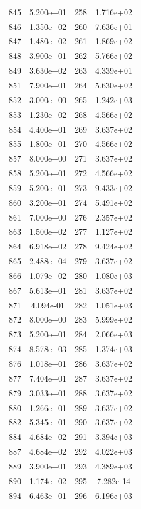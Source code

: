 \documentclass[12pt]{article}
\begin{document}
\begin{longtable}{@{}cccc@{}}
845 & 5.200e+01 & 258 & 1.716e+02 \\
846 & 1.350e+02 & 260 & 7.636e+01 \\
847 & 1.480e+02 & 261 & 1.869e+02 \\
848 & 3.900e+01 & 262 & 5.766e+02 \\
849 & 3.630e+02 & 263 & 4.339e+01 \\
851 & 7.900e+01 & 264 & 5.630e+02 \\
852 & 3.000e+00 & 265 & 1.242e+03 \\
853 & 1.230e+02 & 268 & 4.566e+02 \\
854 & 4.400e+01 & 269 & 3.637e+02 \\
855 & 1.800e+01 & 270 & 4.566e+02 \\
857 & 8.000e+00 & 271 & 3.637e+02 \\
858 & 5.200e+01 & 272 & 4.566e+02 \\
859 & 5.200e+01 & 273 & 9.433e+02 \\
860 & 3.200e+01 & 274 & 5.491e+02 \\
861 & 7.000e+00 & 276 & 2.357e+02 \\
863 & 1.500e+02 & 277 & 1.127e+02 \\
864 & 6.918e+02 & 278 & 9.424e+02 \\
865 & 2.488e+04 & 279 & 3.637e+02 \\
866 & 1.079e+02 & 280 & 1.080e+03 \\
867 & 5.613e+01 & 281 & 3.637e+02 \\
871 & 4.094e-01 & 282 & 1.051e+03 \\
872 & 8.000e+00 & 283 & 5.999e+02 \\
873 & 5.200e+01 & 284 & 2.066e+03 \\
874 & 8.578e+03 & 285 & 1.374e+03 \\
876 & 1.018e+01 & 286 & 3.637e+02 \\
877 & 7.404e+01 & 287 & 3.637e+02 \\
879 & 3.033e+01 & 288 & 3.637e+02 \\
880 & 1.266e+01 & 289 & 3.637e+02 \\
882 & 5.345e+01 & 290 & 3.637e+02 \\
884 & 4.684e+02 & 291 & 3.394e+03 \\
887 & 4.684e+02 & 292 & 4.022e+03 \\
889 & 3.900e+01 & 293 & 4.389e+03 \\
890 & 1.174e+02 & 295 & 7.282e-14 \\
894 & 6.463e+01 & 296 & 6.196e+03 \\

\end{longtable}
\end{document}
